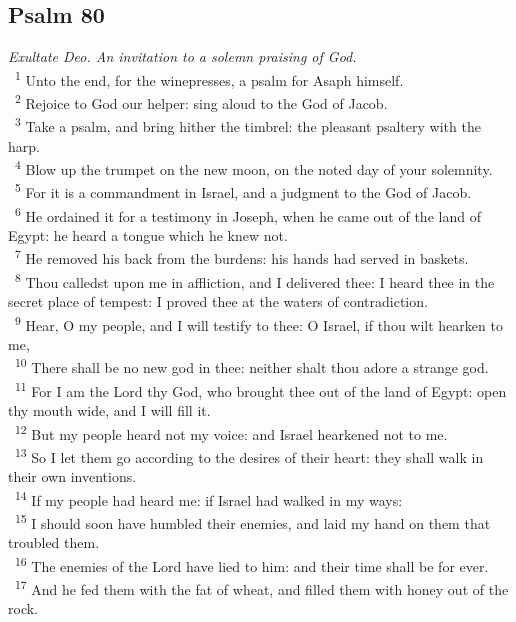 \documentclass[a5paper,12pt]{article}
\begin{document}
\begin{multicols*}{2}
\section{Psalm 80}
\label{sec:org784ec55}
\emph{Exultate Deo. An invitation to a solemn praising of God.}\\

~\textsuperscript{1} Unto the end, for the winepresses, a psalm for Asaph himself.\\
~\textsuperscript{2} Rejoice to God our helper: sing aloud to the God of Jacob.\\
~\textsuperscript{3} Take a psalm, and bring hither the timbrel: the pleasant psaltery with the harp.\\
~\textsuperscript{4} Blow up the trumpet on the new moon, on the noted day of your solemnity.\\
~\textsuperscript{5} For it is a commandment in Israel, and a judgment to the God of Jacob.\\
~\textsuperscript{6} He ordained it for a testimony in Joseph, when he came out of the land of Egypt: he heard a tongue which he knew not.\\
~\textsuperscript{7} He removed his back from the burdens: his hands had served in baskets.\\
~\textsuperscript{8} Thou calledst upon me in affliction, and I delivered thee: I heard thee in the secret place of tempest: I proved thee at the waters of contradiction.\\
~\textsuperscript{9} Hear, O my people, and I will testify to thee: O Israel, if thou wilt hearken to me,\\
~\textsuperscript{10} There shall be no new god in thee: neither shalt thou adore a strange god.\\
~\textsuperscript{11} For I am the Lord thy God, who brought thee out of the land of Egypt: open thy mouth wide, and I will fill it.\\
~\textsuperscript{12} But my people heard not my voice: and Israel hearkened not to me.\\
~\textsuperscript{13} So I let them go according to the desires of their heart: they shall walk in their own inventions.\\
~\textsuperscript{14} If my people had heard me: if Israel had walked in my ways:\\
~\textsuperscript{15} I should soon have humbled their enemies, and laid my hand on them that troubled them.\\
~\textsuperscript{16} The enemies of the Lord have lied to him: and their time shall be for ever.\\
~\textsuperscript{17} And he fed them with the fat of wheat, and filled them with honey out of the rock.\\


\end{multicols*}
\end{document}
